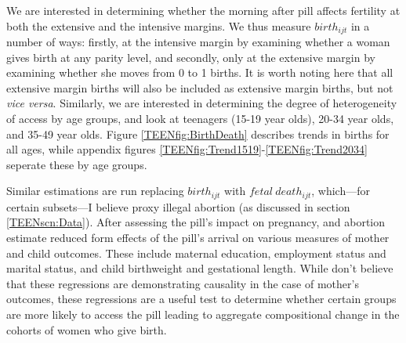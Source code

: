 We are interested in determining whether the morning after pill affects 
fertility at both the extensive and the intensive margins.  We thus measure
$birth_{ijt}$ in a number of ways: firstly, at the intensive margin by 
examining whether a woman gives birth at any parity level, and secondly, only 
at the extensive margin by examining whether she moves from 0 to 1 births. 
It is worth noting here that all extensive margin births will also be 
included as extensive margin births, but not \emph{vice versa}.  Similarly, 
we are interested in determining the degree of heterogeneity of access by age 
groups, and look at teenagers (15-19 year olds), 20-34 year olds, and 35-49 
year olds. Figure \ref{TEENfig:BirthDeath} describes trends in births for all 
ages, while appendix figures \ref{TEENfig:Trend1519}-\ref{TEENfig:Trend2034} 
seperate these by age groups.

Similar estimations are run replacing $birth_{ijt}$ with $fetal\ death_{ijt}$,
which---for certain subsets---I believe proxy illegal abortion (as discussed
in section \ref{TEENscn:Data}).  After assessing the pill's impact on pregnancy, 
and abortion \person estimate reduced form effects of the pill's arrival on 
various measures of mother and child outcomes.  These include maternal education,
employment status and marital status, and child birthweight and gestational
length.  While \person don't believe that these regressions are demonstrating
causality in the case of mother's outcomes, these regressions are a useful test
to determine whether certain groups are more likely to access the pill leading to
aggregate compositional change in the cohorts of women who give birth.

